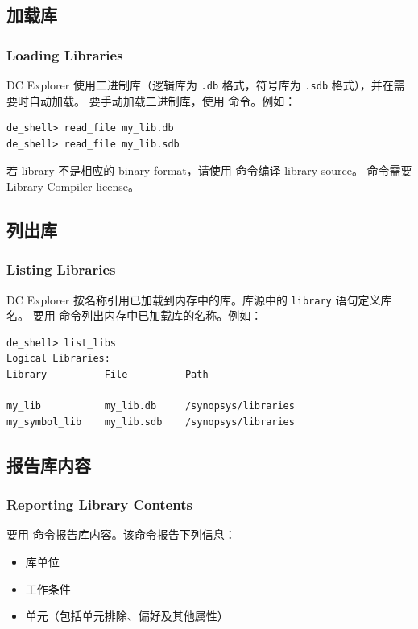 \subsection{加载库}
\subsubsection*{Loading Libraries}

DC Explorer 使用二进制库（逻辑库为 \texttt{.db} 格式，符号库为 \texttt{.sdb} 格式），并在需要时自动加载。
要手动加载二进制库，使用  命令。例如：
\begin{lstlisting}
de_shell> read_file my_lib.db
de_shell> read_file my_lib.sdb
\end{lstlisting}

若 library 不是相应的 binary format，请使用  命令编译 library source。 命令需要 Library-Compiler license。

\subsection{列出库}
\subsubsection*{Listing Libraries}

DC Explorer 按名称引用已加载到内存中的库。库源中的 \texttt{library} 语句定义库名。
要用  命令列出内存中已加载库的名称。例如：
\begin{lstlisting}
de_shell> list_libs
Logical Libraries:
Library          File          Path
-------          ----          ----
my_lib           my_lib.db     /synopsys/libraries
my_symbol_lib    my_lib.sdb    /synopsys/libraries
\end{lstlisting}

\subsection{报告库内容}
\subsubsection*{Reporting Library Contents}

要用  命令报告库内容。该命令报告下列信息：
\begin{itemize}
  \item 库单位
  \item 工作条件
  \item 单元（包括单元排除、偏好及其他属性）
\end{itemize}

